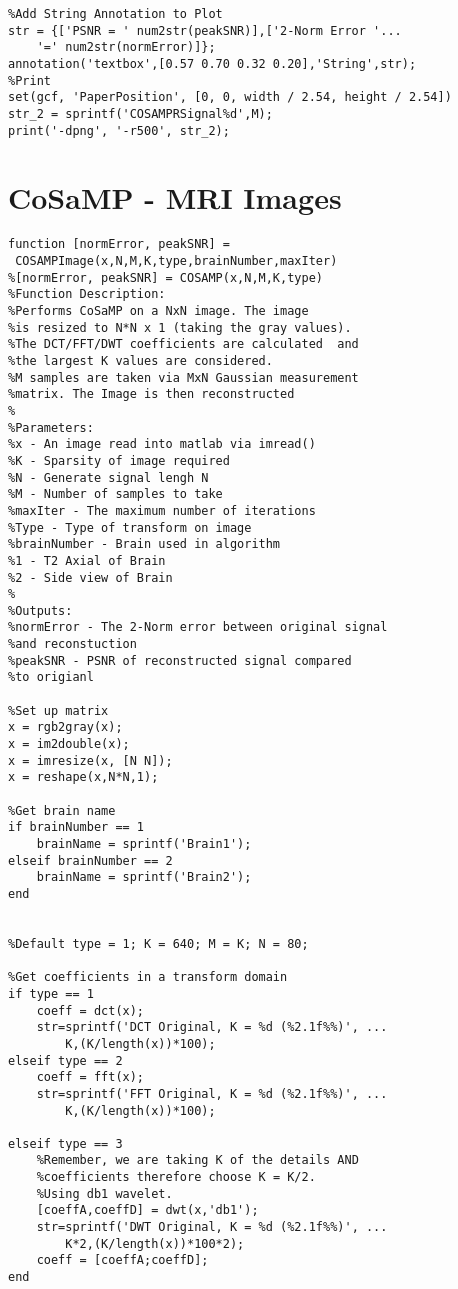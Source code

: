 \documentclass[titlepage,oneside, 12pt]{book}
\theoremstyle{break}
\begin{document}
\begin{appendices}
\begin{lstlisting}
%Add String Annotation to Plot
str = {['PSNR = ' num2str(peakSNR)],['2-Norm Error '...
    '=' num2str(normError)]}; 
annotation('textbox',[0.57 0.70 0.32 0.20],'String',str);
%Print
set(gcf, 'PaperPosition', [0, 0, width / 2.54, height / 2.54])
str_2 = sprintf('COSAMPRSignal%d',M);
print('-dpng', '-r500', str_2);

\end{lstlisting}

\chapter{CoSaMP - MRI Images}

\begin{lstlisting}
function [normError, peakSNR] =
 COSAMPImage(x,N,M,K,type,brainNumber,maxIter)
%[normError, peakSNR] = COSAMP(x,N,M,K,type)
%Function Description: 
%Performs CoSaMP on a NxN image. The image
%is resized to N*N x 1 (taking the gray values).
%The DCT/FFT/DWT coefficients are calculated  and 
%the largest K values are considered. 
%M samples are taken via MxN Gaussian measurement 
%matrix. The Image is then reconstructed
%
%Parameters:
%x - An image read into matlab via imread()
%K - Sparsity of image required
%N - Generate signal lengh N
%M - Number of samples to take
%maxIter - The maximum number of iterations
%Type - Type of transform on image
%brainNumber - Brain used in algorithm
%1 - T2 Axial of Brain
%2 - Side view of Brain
%
%Outputs:
%normError - The 2-Norm error between original signal
%and reconstuction
%peakSNR - PSNR of reconstructed signal compared 
%to origianl

%Set up matrix
x = rgb2gray(x);
x = im2double(x);
x = imresize(x, [N N]);
x = reshape(x,N*N,1);

%Get brain name
if brainNumber == 1
    brainName = sprintf('Brain1');
elseif brainNumber == 2
    brainName = sprintf('Brain2');
end


%Default type = 1; K = 640; M = K; N = 80;

%Get coefficients in a transform domain
if type == 1
    coeff = dct(x);
    str=sprintf('DCT Original, K = %d (%2.1f%%)', ...
        K,(K/length(x))*100);
elseif type == 2
    coeff = fft(x);
    str=sprintf('FFT Original, K = %d (%2.1f%%)', ...
        K,(K/length(x))*100);
    
elseif type == 3
    %Remember, we are taking K of the details AND 
    %coefficients therefore choose K = K/2. 
    %Using db1 wavelet.
    [coeffA,coeffD] = dwt(x,'db1');
    str=sprintf('DWT Original, K = %d (%2.1f%%)', ...
        K*2,(K/length(x))*100*2);
    coeff = [coeffA;coeffD];    
end
    


\end{lstlisting}
\end{appendices}
\end{document}
